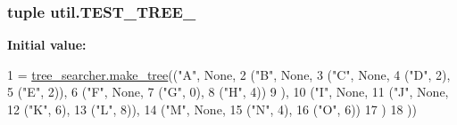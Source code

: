 \subsubsection[{T\+E\+S\+T\+\_\+\+T\+R\+E\+E\+\_\+1}]{\setlength{\rightskip}{0pt plus 5cm}tuple util.\+T\+E\+S\+T\+\_\+\+T\+R\+E\+E\+\_}\label{namespaceutil_aeb1172b7a9311e22f027d739b689c080}
{\bfseries Initial value\+:}
\begin{DoxyCode}
1 = \hyperlink{namespacetree__searcher_ad7aa3b2a8e8a2967ca966399c95c9401}{tree\_searcher.make\_tree}((\textcolor{stringliteral}{"A"}, \textcolor{keywordtype}{None},
2                                        (\textcolor{stringliteral}{"B"}, \textcolor{keywordtype}{None},
3                                         (\textcolor{stringliteral}{"C"}, \textcolor{keywordtype}{None},
4                                          (\textcolor{stringliteral}{"D"}, 2),
5                                          (\textcolor{stringliteral}{"E"}, 2)),
6                                         (\textcolor{stringliteral}{"F"}, \textcolor{keywordtype}{None},
7                                          (\textcolor{stringliteral}{"G"}, 0),
8                                          (\textcolor{stringliteral}{"H"}, 4))
9                                         ),
10                                        (\textcolor{stringliteral}{"I"}, \textcolor{keywordtype}{None},
11                                         (\textcolor{stringliteral}{"J"}, \textcolor{keywordtype}{None},
12                                          (\textcolor{stringliteral}{"K"}, 6),
13                                          (\textcolor{stringliteral}{"L"}, 8)),
14                                         (\textcolor{stringliteral}{"M"}, \textcolor{keywordtype}{None},
15                                          (\textcolor{stringliteral}{"N"}, 4),
16                                          (\textcolor{stringliteral}{"O"}, 6))
17                                         )
18                                        ))
\end{DoxyCode}
\hypertarget{namespaceutil_a9ae6aec6e35dfd821e0ffaac044a1990}{}
